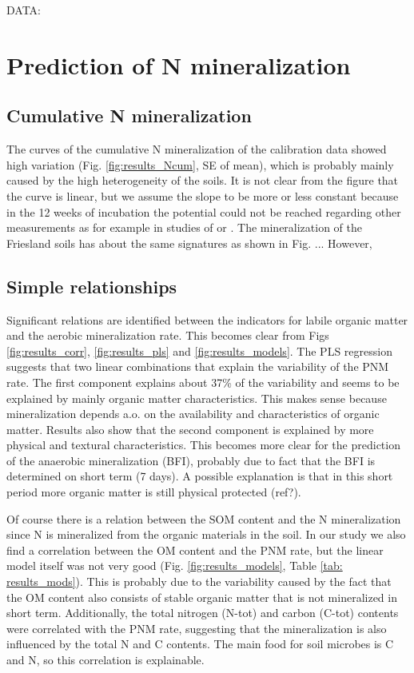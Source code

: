 \documentclass[10pt,twoside,dutch,english]{report}
\begin{document}
DATA:


\section{Prediction of N mineralization}
\subsection{Cumulative N mineralization}
The curves of the cumulative N mineralization of the calibration data showed high variation (Fig. \ref{fig:results_Ncum}, SE of mean), which is probably mainly caused by the high heterogeneity of the soils. It is not clear from the figure that the curve is linear, but we assume the slope to be more or less  constant because in the 12 weeks of incubation the potential could not be reached regarding other measurements as for example in studies of \citet{Ros2011} or \citet{Dessureault-Rompre2013}.
The mineralization of the Friesland soils has about the same signatures as shown in Fig. ... However, 

\subsection{Simple relationships  }
Significant relations are identified between the indicators for labile organic matter and the aerobic mineralization rate. This becomes clear from Figs \ref{fig:results_corr}, \ref{fig:results_pls} and \ref{fig:results_models}. The PLS regression suggests that two linear combinations that explain the variability of the PNM rate. The first component explains about 37\% of the variability and seems to be explained by mainly organic matter characteristics. This makes sense because mineralization depends a.o. on the availability and characteristics of organic matter. Results also show that the second component is explained by more physical and textural characteristics. This becomes more clear for the prediction of the anaerobic mineralization (BFI), probably due to fact that the BFI is determined on short term (7 days). A possible explanation is that in this short period more organic matter is still physical protected (ref?).

Of course there is a relation between the SOM content and the N mineralization since N is mineralized from the organic materials in the soil. In our study we also find a correlation between the OM content and the PNM rate, but the linear model itself was not very good (Fig. \ref{fig:results_models}, Table \ref{tab: results_mods}). This is probably due to the variability caused by the fact that the OM content also consists of stable organic matter that is not mineralized in short term.  Additionally, the total nitrogen (N-tot) and carbon (C-tot) contents were correlated with the PNM rate, suggesting that the mineralization is also influenced by the total N and C contents. The main food for soil microbes is C and N, so this correlation is explainable.   
\end{document}
